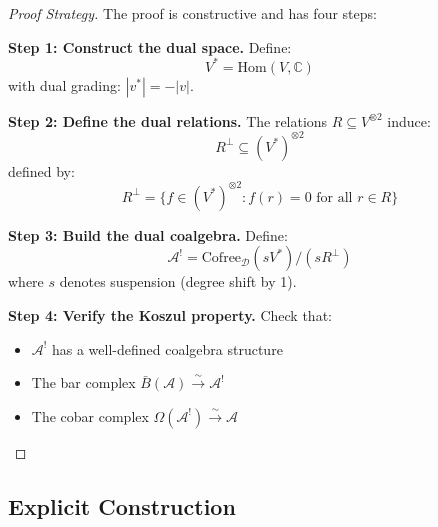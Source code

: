 \begin{proof}[Proof Strategy]
The proof is constructive and has four steps:

\textbf{Step 1: Construct the dual space.}
Define:
$$V^* = \text{Hom}(V, \mathbb{C})$$
with dual grading: $|v^*| = -|v|$.

\textbf{Step 2: Define the dual relations.}
The relations $R \subseteq V^{\otimes 2}$ induce:
$$R^\perp \subseteq (V^*)^{\otimes 2}$$
defined by:
$$R^\perp = \{f \in (V^*)^{\otimes 2} : f(r) = 0 \text{ for all } r \in R\}$$

\textbf{Step 3: Build the dual coalgebra.}
Define:
$$\mathcal{A}^! = \text{Cofree}_{\mathcal{D}}(sV^*) / (sR^\perp)$$
where $s$ denotes suspension (degree shift by 1).

\textbf{Step 4: Verify the Koszul property.}
Check that:
\begin{itemize}
\item $\mathcal{A}^!$ has a well-defined coalgebra structure
\item The bar complex $\bar{B}(\mathcal{A}) \xrightarrow{\sim} \mathcal{A}^!$
\item The cobar complex $\Omega(\mathcal{A}^!) \xrightarrow{\sim} \mathcal{A}$
\end{itemize}
\end{proof}

\subsection{Explicit Construction}


